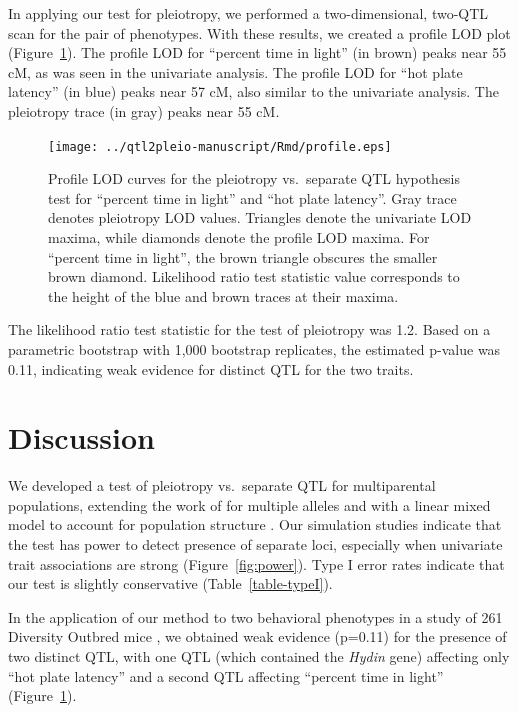 \documentclass[oneside]{book}\usepackage[]{graphicx}\usepackage[]{color}
\begin{document}
In applying our test for pleiotropy,  we performed a two-dimensional, two-QTL scan for the pair of
phenotypes. With these results, we created a profile LOD plot
(Figure~\ref{fig:profiles}). The profile LOD for ``percent
time in light'' (in brown) peaks near 55 cM, as was seen in the univariate
analysis.  The profile LOD for ``hot plate latency'' (in blue) peaks near 57 cM,
also similar to the univariate analysis.
The pleiotropy trace (in gray) peaks near 55 cM.

\begin{figure}
\texttt{[image: ../qtl2pleio-manuscript/Rmd/profile.eps]}
\caption{Profile LOD curves for the pleiotropy vs.\ separate QTL
  hypothesis test for ``percent time in light'' and ``hot plate latency''.
  Gray trace denotes pleiotropy LOD values. Triangles denote the
  univariate LOD maxima, while diamonds denote the profile LOD maxima.
  For ``percent time in light'', the brown triangle obscures the
  smaller brown diamond. Likelihood ratio test statistic value
  corresponds to the height of the blue and brown traces at their
  maxima.}
\label{fig:profiles}
\end{figure}

The likelihood ratio test statistic for the test of pleiotropy was
1.2. Based on a parametric bootstrap with 1,000 bootstrap replicates,
the estimated p-value was 0.11, indicating weak
evidence for distinct QTL for the two traits.









\section{Discussion}

We developed a test of pleiotropy vs.\ separate QTL for multiparental
populations, extending the work of \citet{jiang1995multiple} for
multiple alleles and with a linear mixed model to account for
population structure \citep{kang2010variance, yang2014advantages}. Our simulation
studies indicate that the test has power to detect presence of
separate loci, especially when univariate trait associations are
strong (Figure~\ref{fig:power}). Type I error rates indicate that our
test is slightly conservative (Table~\ref{table-typeI}).

In the application of our method to two behavioral phenotypes in a
study of 261 Diversity Outbred mice
\citep{recla2014precise,logan2013high}, we obtained weak evidence
(p=0.11) for the presence of two distinct QTL, with one QTL (which
contained the \textit{Hydin} gene) affecting only ``hot plate latency'' and a
second QTL affecting ``percent time in light'' (Figure~\ref{fig:profiles}).
\end{document}
